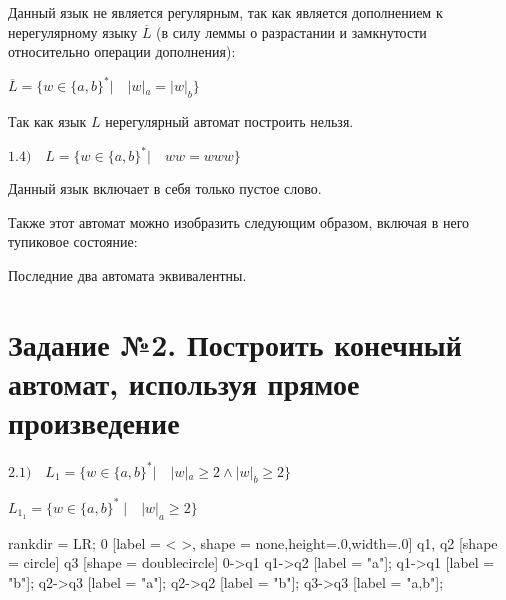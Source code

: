 \documentclass{article}
\begin{document}
Данный язык не является регулярным, так как является дополнением к нерегулярному языку $\overline L$ (в силу леммы о разрастании и замкнутости относительно операции дополнения):

\begin{center}
$\overline L = \{ w \in \{ a, b\}^* | \quad |w|_a = |w|_b \}$  
\end{center}

Так как язык $L$ нерегулярный автомат построить нельзя.

\begin{center}
$1.4) \quad L = \{ w \in \{ a, b\}^* | \quad ww = www \}$
\end{center} 

Данный язык включает в себя только пустое слово.

\begin{center}

\end{center} 

Также этот автомат можно изобразить следующим образом, включая в него тупиковое состояние:
\begin{center}
\end{center} 

Последние два автомата эквивалентны.


\section{Задание №2. Построить конечный автомат, используя прямое произведение}

\begin{center}
$2.1) \quad L_1 = \{w \in \{ a,b \}^*  | \quad |w|_a \geq 2 \wedge |w|_b \geq 2 \}$
\end{center}



\begin{center}
$L_1_1 = \{w \in \{ a,b \}^* \; | \quad |w|_a \geq 2 \}$


 {
    rankdir = LR;
    0 [label = < >, shape = none,height=.0,width=.0]
    q1, q2 [shape = circle]
    q3 [shape = doublecircle]
    0->q1
    q1->q2 [label = "a"];
    q1->q1 [label = "b"];
    q2->q3 [label = "a"];
    q2->q2 [label = "b"];
    q3->q3 [label = "a,b"];
}
\end{center}
\end{document}
